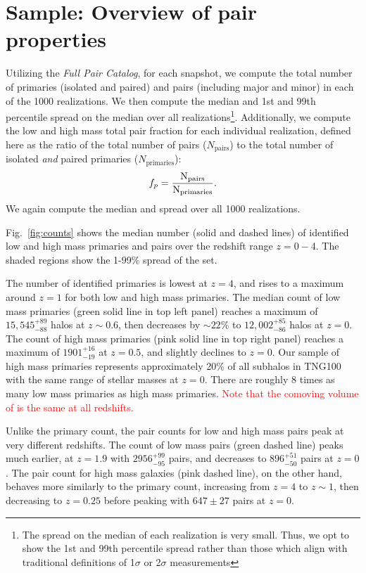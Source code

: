 \documentclass[twocolumn]{aastex631}
\newcommand{\add}[1]{\textcolor{red}{#1}}
\newcommand{\paircat}{\textit{Full Pair Catalog}}
\begin{document}
\section{Sample: Overview of pair properties} \label{sec:pairprops}
    Utilizing the \paircat, for each snapshot, we compute the total number of primaries (isolated and paired) and pairs (including major and minor) in each of the 1000 realizations. We then compute the median and 1st and 99th percentile spread on the median over all realizations\footnote{The spread on the median of each realization is very small. Thus, we opt to show the 1st and 99th percentile spread rather than those which align with traditional definitions of 1$\sigma$ or 2$\sigma$ measurements}. 
    Additionally, we compute the low and high mass total pair fraction for each individual realization, defined here as the ratio of the total number of pairs ($N_{\mathrm{pairs}}$) to the total number of isolated \textit{and} paired primaries ($N_{\mathrm{primaries}}$):
    $$f_{p}=\rm \frac{N_{\mathrm{pairs}}}{N_{\mathrm{primaries}}}.$$
    We again compute the median and spread over all 1000 realizations.
    
    Fig.~\ref{fig:counts} shows the median number (solid and dashed lines) of identified low and high mass primaries and pairs over the redshift range $z=0-4$.   
    The shaded regions show the 1-99\% spread of the set. 

    The number of identified primaries is lowest at $z=4$, and rises to a maximum around $z=1$ for both low and high mass primaries.
    The median count of low mass primaries (green solid line in top left panel) reaches a maximum of $15,545^{+89}_{-88}$ halos at $z\sim0.6$, then decreases by $\sim22\%$ to $12,002^{+85}_{-86}$ halos at $z=0$. 
    The count of high mass primaries (pink solid line in top right panel) reaches a maximum of $1901^{+16}_{-19}$ at $z=0.5$, and slightly declines to $z=0$. 
    Our sample of high mass primaries represents approximately 20\% of all subhalos in TNG100 with the same range of stellar masses at $z=0$.
    There are roughly 8 times as many low mass primaries as high mass primaries. \add{Note that the comoving volume of \tng{} is the same at all redshifts.}

    Unlike the primary count, the pair counts for low and high mass pairs peak at very different redshifts. 
    The count of low mass pairs (green dashed line) peaks much earlier, at $z=1.9$ with $2956^{+99}_{-95}$ pairs, and decreases to $896^{+51}_{-50}$ pairs at $z=0$.
    The pair count for high mass galaxies (pink dashed line), on the other hand, behaves more similarly to the primary count, increasing from $z=4$ to $z\sim1$, then decreasing to $z=0.25$ before peaking with $647\pm27$ pairs at $z=0$. 
\end{document}
